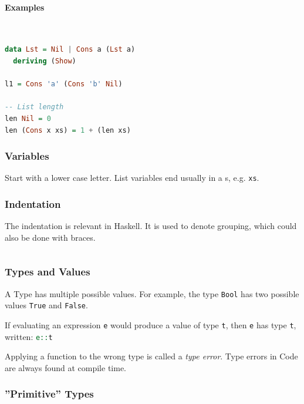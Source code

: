 \paragraph{Examples} \hfill \\
\begin{lstlisting}[language=haskell]
data Lst = Nil | Cons a (Lst a)
  deriving (Show)

l1 = Cons 'a' (Cons 'b' Nil)

-- List length
len Nil = 0
len (Cons x xs) = 1 + (len xs)

\end{lstlisting}

\subsubsection{Variables}

Start with a lower case letter. List variables end usually in a s, e.g. \lstinline|xs|.

\subsubsection{Indentation}

The indentation is relevant in Haskell. It is used to denote grouping, which could also be done with braces.

\begin{lstlisting}[language=Haskell]

\end{lstlisting}

\subsubsection{Types and Values}

A Type has multiple possible values. For example, the type \lstinline|Bool| has two possible values \lstinline|True| and \lstinline|False|.


If evaluating an expression \lstinline|e| would produce a value of type \lstinline|t|, then \lstinline|e| has type \lstinline|t|, written: \lstinline[language=Haskell]|e::t|

Applying a function to the wrong type is called a \emph{type error}. Type errors in Code are always found at compile time.

\subsubsection{''Primitive'' Types}

